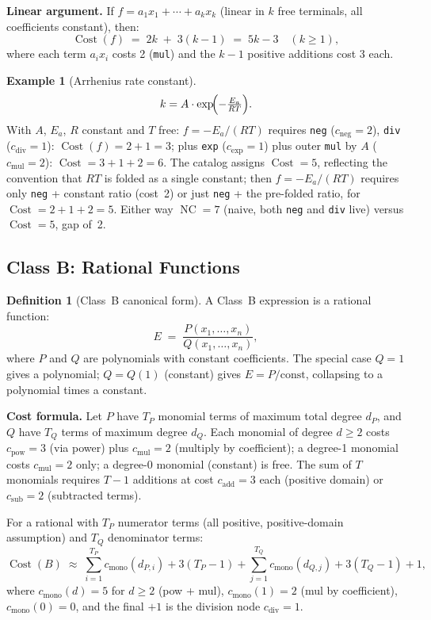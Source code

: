 \documentclass[12pt,a4paper]{article}
\theoremstyle{definition}
\newtheorem{definition}[theorem]{Definition}
\newtheorem{example}[theorem]{Example}
\newcommand{\NC}{\operatorname{NC}}
\newcommand{\Cost}{\operatorname{Cost}}
\newcommand{\cexp}{c_{\mathrm{exp}}}
\newcommand{\cmul}{c_{\mathrm{mul}}}
\newcommand{\cdiv}{c_{\mathrm{div}}}
\newcommand{\cadd}{c_{\mathrm{add}}}
\newcommand{\csub}{c_{\mathrm{sub}}}
\newcommand{\cpow}{c_{\mathrm{pow}}}
\newcommand{\cneg}{c_{\mathrm{neg}}}
\begin{document}
\medskip
\noindent\textbf{Linear argument.}
If $f = a_1 x_1 + \cdots + a_k x_k$ (linear in $k$ free terminals,
all coefficients constant), then:
\[
  \Cost(f) \;=\; 2k \;+\; 3(k-1) \;=\; 5k - 3
  \quad (k \geq 1),
\]
where each term $a_i x_i$ costs 2 (\texttt{mul}) and the $k-1$ positive
additions cost 3 each.

\begin{example}[Arrhenius rate constant]
\[
  k = A \cdot \exp\!\Bigl(-\tfrac{E_a}{RT}\Bigr).
\]
With $A$, $E_a$, $R$ constant and $T$ free: $f = -E_a/(RT)$ requires
\texttt{neg} ($\cneg=2$), \texttt{div} ($\cdiv=1$):
$\Cost(f) = 2 + 1 = 3$; plus \texttt{exp} ($\cexp=1$) plus outer
\texttt{mul} by $A$ ($\cmul=2$): $\Cost = 3 + 1 + 2 = 6$.
The catalog assigns $\Cost = 5$, reflecting the convention that $RT$ is
folded as a single constant; then $f = -E_a/(RT)$ requires only
\texttt{neg} + constant ratio (cost~2) or just \texttt{neg} + the
pre-folded ratio, for $\Cost = 2 + 1 + 2 = 5$.
Either way $\NC = 7$ (naive, both \texttt{neg} and \texttt{div} live)
versus $\Cost = 5$, gap of~2.
\end{example}

\subsection{Class B: Rational Functions}
\label{subsec:classB}

\begin{definition}[Class~B canonical form]
\label{def:classB}
A Class~B expression is a rational function:
\[
  E \;=\; \frac{P(x_1, \ldots, x_n)}{Q(x_1, \ldots, x_n)},
\]
where $P$ and $Q$ are polynomials with constant coefficients.
The special case $Q=1$ gives a polynomial; $Q = Q(1)$ (constant)
gives $E = P / \text{const}$, collapsing to a polynomial times a constant.
\end{definition}

\noindent\textbf{Cost formula.}
Let $P$ have $T_P$ monomial terms of maximum total degree $d_P$, and
$Q$ have $T_Q$ terms of maximum degree $d_Q$.
Each monomial of degree $d \geq 2$ costs $\cpow = 3$ (via power) plus
$\cmul = 2$ (multiply by coefficient); a degree-1 monomial costs $\cmul = 2$
only; a degree-0 monomial (constant) is free.
The sum of $T$ monomials requires $T-1$ additions at cost $\cadd = 3$ each
(positive domain) or $\csub = 2$ (subtracted terms).

For a rational with $T_P$ numerator terms (all positive, positive-domain
assumption) and $T_Q$ denominator terms:
\begin{equation}
\label{eq:costB}
  \Cost(B) \;\approx\;
    \sum_{i=1}^{T_P} c_{\mathrm{mono}}(d_{P,i})
  + 3(T_P - 1)
  + \sum_{j=1}^{T_Q} c_{\mathrm{mono}}(d_{Q,j})
  + 3(T_Q - 1)
  + 1,
\end{equation}
where $c_{\mathrm{mono}}(d) = 5$ for $d \geq 2$ (pow + mul), $c_{\mathrm{mono}}(1) = 2$
(mul by coefficient), $c_{\mathrm{mono}}(0) = 0$, and the final $+1$ is
the division node $\cdiv = 1$.
\end{document}
